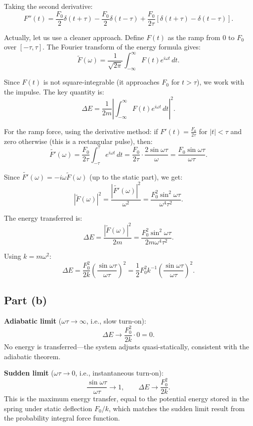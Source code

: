 \documentclass[12pt]{article}
\begin{document}
Taking the second derivative:
\[
F''(t) = \frac{F_0}{2}\delta(t+\tau) - \frac{F_0}{2}\delta(t-\tau) + \frac{F_0}{2\tau}[\delta(t+\tau) - \delta(t-\tau)].
\]

Actually, let us use a cleaner approach. Define $F(t)$ as the ramp from $0$ to $F_0$ over $[-\tau, \tau]$. The Fourier transform of the energy formula gives:
\[
\tilde{F}(\omega) = \frac{1}{\sqrt{2\pi}}\int_{-\infty}^{\infty}F(t)e^{i\omega t}\,dt.
\]

Since $F(t)$ is not square-integrable (it approaches $F_0$ for $t > \tau$), we work with the impulse. The key quantity is:
\[
\Delta E = \frac{1}{2m}\left|\int_{-\infty}^{\infty}F(t)e^{i\omega t}\,dt\right|^2.
\]

For the ramp force, using the derivative method: if $F'(t) = \frac{F_0}{2\tau}$ for $|t|<\tau$ and zero otherwise (this is a rectangular pulse), then:
\[
\widetilde{F'}(\omega) = \frac{F_0}{2\tau}\int_{-\tau}^{\tau}e^{i\omega t}\,dt = \frac{F_0}{2\tau}\cdot\frac{2\sin\omega\tau}{\omega} = \frac{F_0\sin\omega\tau}{\omega\tau}.
\]

Since $\widetilde{F'}(\omega) = -i\omega\tilde{F}(\omega)$ (up to the static part), we get:
\[
|\tilde{F}(\omega)|^2 = \frac{|\widetilde{F'}(\omega)|^2}{\omega^2} = \frac{F_0^2\sin^2\omega\tau}{\omega^4\tau^2}.
\]

The energy transferred is:
\[
\Delta E = \frac{|\tilde{F}(\omega)|^2}{2m} = \frac{F_0^2\sin^2\omega\tau}{2m\omega^4\tau^2}.
\]

Using $k = m\omega^2$:
\[
\boxed{\Delta E = \frac{F_0^2}{2k}\left(\frac{\sin\omega\tau}{\omega\tau}\right)^2 = \frac{1}{2}F_0^2 k^{-1}\left(\frac{\sin\omega\tau}{\omega\tau}\right)^2.}
\]

\subsection*{Part (b)}

\textbf{Adiabatic limit} ($\omega\tau \to \infty$, i.e., slow turn-on):
\[
\Delta E \to \frac{F_0^2}{2k}\cdot 0 = 0.
\]
No energy is transferred---the system adjusts quasi-statically, consistent with the adiabatic theorem.

\textbf{Sudden limit} ($\omega\tau \to 0$, i.e., instantaneous turn-on):
\[
\frac{\sin\omega\tau}{\omega\tau} \to 1, \qquad \Delta E \to \frac{F_0^2}{2k}.
\]
This is the maximum energy transfer, equal to the potential energy stored in the spring under static deflection $F_0/k$, which matches the sudden limit result from the probability integral force function.
\end{document}
